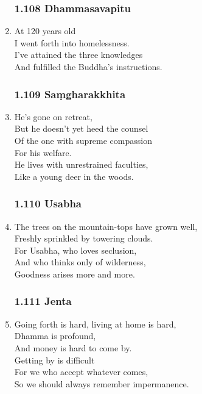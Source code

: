 \documentclass[10pt, openany]{book}
\begin{document}
\begin{enumerate}
\subsubsection*{1.108 Dhammasavapitu}

\item At 120 years old\\
I went forth into homelessness.\\
I’ve attained the three knowledges\\
And fulfilled the Buddha’s instructions.

\subsubsection*{1.109 Saṃgharakkhita}

\item He’s gone on retreat, \\
But he doesn’t yet heed the counsel\\
Of the one with supreme compassion \\
For his welfare.\\
He lives with unrestrained faculties,\\
Like a young deer in the woods.

\subsubsection*{1.110 Usabha}

\item The trees on the mountain-tops have grown well,\\
Freshly sprinkled by towering clouds.\\
For Usabha, who loves seclusion, \\
And who thinks only of wilderness,\\
Goodness arises more and more.

\subsubsection*{1.111 Jenta}

\item Going forth is hard, living at home is hard,\\
Dhamma is profound, \\
And money is hard to come by.\\
Getting by is difficult \\
For we who accept whatever comes,\\
So we should always remember impermanence.


\end{enumerate}
\end{document}
